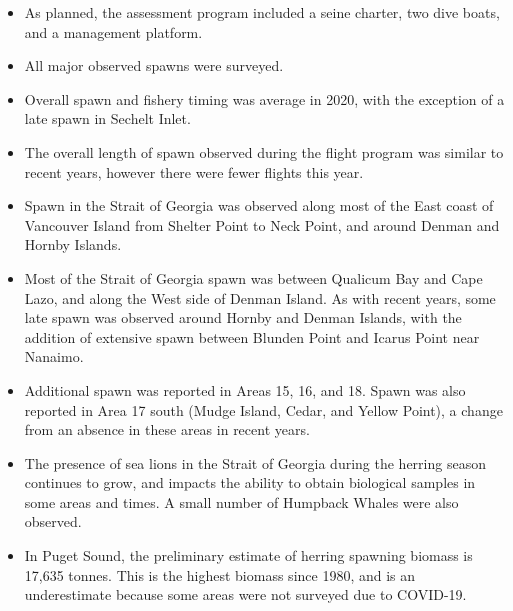\begin{itemize}

\item As planned, the assessment program included a seine charter, two dive boats, and a management platform.

\item All major observed spawns were surveyed.

\item Overall spawn and fishery timing was average in 2020, with the exception of a late spawn in Sechelt Inlet.

\item The overall length of spawn observed during the flight program was similar to recent years,
however there were fewer flights this year.

\item Spawn in the Strait of Georgia was observed along most of the East coast of Vancouver Island from Shelter Point to Neck Point, and around Denman and Hornby Islands.

\item Most of the Strait of Georgia spawn was between Qualicum Bay and Cape Lazo, and along the West side of Denman Island.
As with recent years, some late spawn was observed around Hornby and Denman Islands,
with the addition of extensive spawn between Blunden Point and Icarus Point near Nanaimo.

\item Additional spawn was reported in Areas 15, 16, and 18.
Spawn was also reported in Area 17 south (Mudge Island, Cedar, and Yellow Point), a change from an absence in these areas in recent years.

\item The presence of sea lions in the Strait of Georgia during the herring season continues to grow, and impacts the ability to obtain biological samples in some areas and times.
A small number of Humpback Whales were also observed.

\item In Puget Sound, the preliminary estimate of herring spawning biomass is 17,635 tonnes.
This is the highest biomass since 1980, and is an underestimate because some areas were not surveyed due to COVID-19.

\end{itemize}
